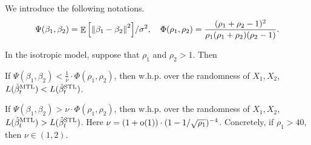 We introduce the following notations.
{\small\begin{align*}
	\Psi(\beta_1, \beta_2) = {\mathop{\mathbb{E}}\left[ \left\| \beta_1 - \beta_2 \right\|^2 \right]} / {\sigma^2},  \quad \Phi(\rho_1, \rho_2) = \frac{(\rho_1 + \rho_2 - 1)^2}{\rho_1 (\rho_1 + \rho_2) (\rho_2 - 1)}.
\end{align*}}

\begin{proposition}\label{prop_dist_transition}
	In the isotropic model, suppose that $\rho_1$ and $\rho_2 > 1$.
	Then
	\squishlist
		\item If $\Psi(\beta_1, \beta_2) < \frac{1}{\nu} \cdot  \Phi(\rho_1, \rho_2)$, then w.h.p. over the randomness of $X_1,X_2$, $L(\hat{\beta}_t^{\text{MTL}}) < L(\hat{\beta}_t^{\text{STL}})$.
		\item If $\Psi(\beta_1, \beta_2) > {\nu} \cdot  \Phi(\rho_1, \rho_2)$, then w.h.p. over the randomness of $X_1,X_2$, $L(\hat{\beta}_t^{\text{MTL}}) > L(\hat{\beta}_t^{\text{STL}})$.
	\squishend
	Here {\small$\nu = (1+\operatorname{o}(1)) \cdot (1 - 1/\sqrt{\rho_1})^{-4}$}.
	Concretely, if $\rho_1 > 40$, then $\nu\in (1,2)$.
\end{proposition}


